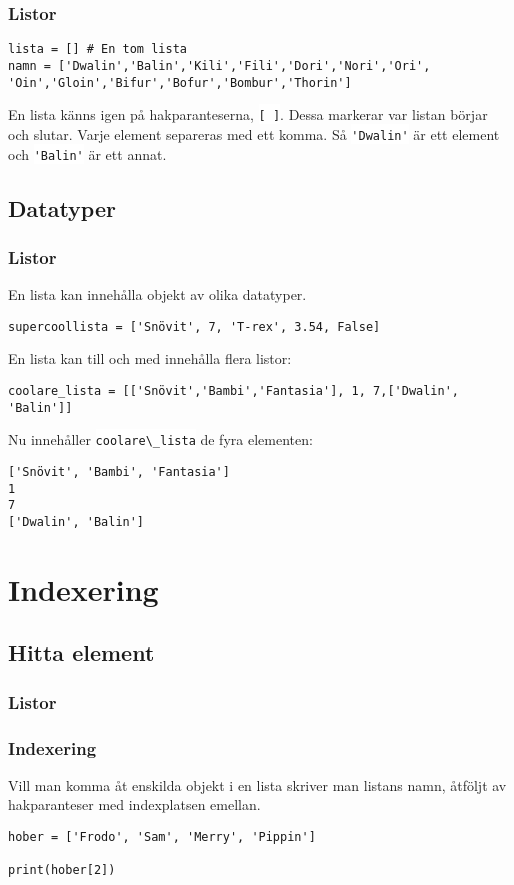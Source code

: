 \documentclass[aspectratio=169]{beamer}
\newcommand{\code}[1]{\colorbox{white}{\lstinline{#1}}}
\begin{document}
\begin{frame}[fragile]
	\frametitle{Listor}
	
	\begin{lstlisting}
lista = [] # En tom lista
namn = ['Dwalin','Balin','Kili','Fili','Dori','Nori','Ori',    'Oin','Gloin','Bifur','Bofur','Bombur','Thorin']
	\end{lstlisting}
	
	En lista känns igen på hakparanteserna, \code{[ ]}. Dessa markerar var listan börjar och slutar. Varje element separeras med ett komma. Så \code{'Dwalin'} är ett element och \code{'Balin'} är ett annat.

\end{frame}

\subsection{Datatyper}

\begin{frame}[fragile]
\frametitle{Listor}

En lista kan innehålla objekt av olika datatyper.

\begin{lstlisting}
supercoollista = ['Snövit', 7, 'T-rex', 3.54, False]
\end{lstlisting}

En lista kan till och med innehålla flera listor:

\begin{lstlisting}
coolare_lista = [['Snövit','Bambi','Fantasia'], 1, 7,['Dwalin', 'Balin']]
\end{lstlisting}

Nu innehåller \code{coolare\_lista} de fyra elementen:

\begin{lstlisting}
['Snövit', 'Bambi', 'Fantasia']
1
7
['Dwalin', 'Balin']
\end{lstlisting}

\end{frame}

\section{Indexering}

\subsection{Hitta element}

\begin{frame}[fragile]
	\frametitle{Listor}
	\frametitle{Indexering}

	Vill man komma åt enskilda objekt i en lista skriver man listans namn, åtföljt av hakparanteser med indexplatsen emellan.

	\begin{lstlisting}
hober = ['Frodo', 'Sam', 'Merry', 'Pippin']

print(hober[2])
	\end{lstlisting}

\end{frame}
\end{document}
